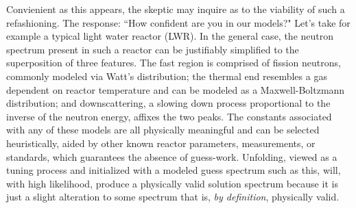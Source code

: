 Convienient as this appears, the skeptic may inquire as to the viability of such a refashioning.
The response: ``How confident are you in our models?"
Let's take for example a typical light water reactor (LWR).
In the general case, the neutron spectrum present in such a reactor can be justifiably simplified to the superposition of three features.
The fast region is comprised of fission neutrons, commonly modeled via Watt's distribution; the thermal end resembles a gas dependent on reactor temperature and can be modeled as a Maxwell-Boltzmann distribution; and downscattering, a slowing down process proportional to the inverse of the neutron energy, affixes the two peaks.
The constants associated with any of these models are all physically meaningful and can be selected heuristically, aided by other known reactor parameters, measurements, or standards, which guarantees the absence of guess-work.
Unfolding, viewed as a tuning process and initialized with a modeled guess spectrum such as this, will, with high likelihood, produce a physically valid solution spectrum because it is just a slight alteration to some spectrum that is, {\it by definition}, physically valid.

